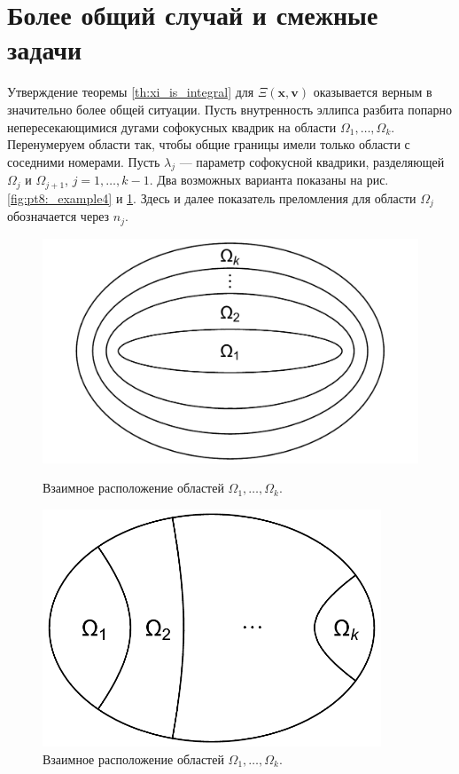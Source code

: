 \section{Более общий случай и смежные задачи}\label{sec:ch4/sec1}
Утверждение теоремы \ref{th:xi_is_integral} для $\Xi(\mathbf{x}, \mathbf{v})$ оказывается верным в значительно более общей ситуации.
Пусть внутренность эллипса разбита попарно непересекающимися дугами софокусных квадрик на области $\Omega_1, \ldots, \Omega_k$.  Перенумеруем области так, чтобы общие границы имели только области с соседними номерами. Пусть $\lambda_j$ --- параметр софокусной квадрики, разделяющей $\Omega_j$ и $\Omega_{j+1}$, $j=1, \ldots, k-1$. Два возможных варианта показаны на рис. \ref{fig:pt8:_example4} и \ref{fig:pt8:_example5}. Здесь и далее показатель преломления для области $\Omega_j$ обозначается через $n_j$.
\begin{figure}[!htb]
   \includegraphics[width=1\textwidth]{images/ch4/section1/multiple ellipses.pdf}
    \caption{Взаимное расположение областей $\Omega_1, \ldots, \Omega_k$.}
    \label{fig:pt8:_example4}
\endminipage\hfill
{}
    \includegraphics[width=0.9\textwidth]{images/ch4/section1/multiple hyperbolas.pdf}   
    \caption{Взаимное расположение областей $\Omega_1, \ldots, \Omega_k$.}
    \label{fig:pt8:_example5}
\endminipage\hfill
\end{figure}


